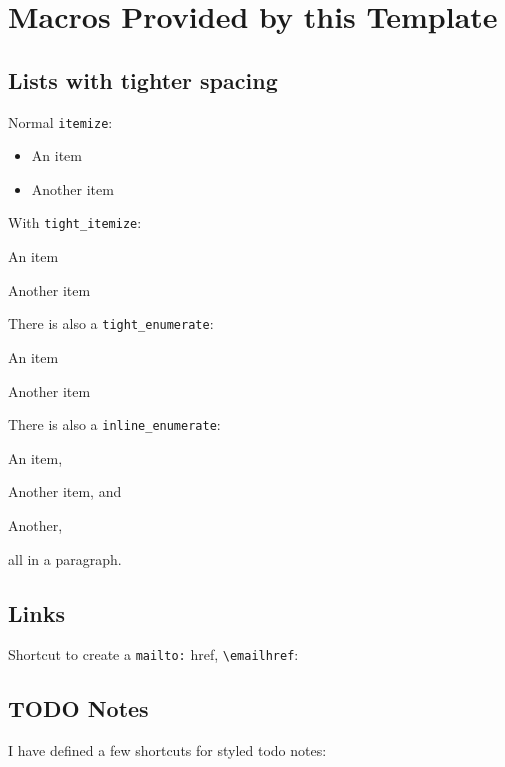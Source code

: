 \section{Macros Provided by this Template}

\subsection{Lists with tighter spacing}

Normal \lstinline{itemize}:

\begin{itemize}
    \item An item
    \item Another item
\end{itemize}

With \lstinline{tight_itemize}:

\begin{tight_itemize}
    \item An item
    \item Another item
\end{tight_itemize}

There is also a \lstinline{tight_enumerate}:

\begin{tight_enumerate}
    \item An item
    \item Another item
\end{tight_enumerate}

There is also a \lstinline{inline_enumerate}:
\begin{inline_enumerate}
    \item An item,
    \item Another item,
        and
    \item Another,
\end{inline_enumerate}
all in a paragraph.


\subsection{Links}

Shortcut to create a \lstinline{mailto:} href, \lstinline{\emailhref}:


\subsection{TODO Notes}

I have defined a few shortcuts for styled todo notes:

